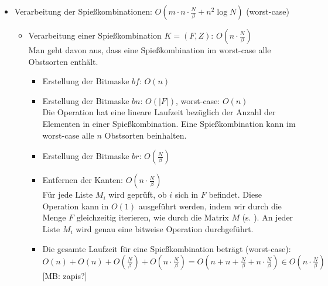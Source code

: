 \documentclass[a4paper,10pt,ngerman]{scrartcl}
\newcommand{\mb}[1]{{\color{red}[MB: #1]}}
\begin{document}
\begin{itemize}
\begin{itemize}
    \item Die gesamte Laufzeit für diesen Teil (worst-case): $O(n \cdot \frac{N}{\beta}) + O(n) + O(w \log w)
    + O(m \cdot n \log n) + O(w (\log n + \log w)) + O(m \cdot n \log n) = 
    O(n \cdot \frac{N}{\beta} + n + w \log w + m \cdot n \log n + w (\log n + \log w) + m \cdot n \log n) \in 
    O(n \cdot \frac{N}{\beta} + m \cdot n \log n + w (\log n + \log w)) \in 
    O(n (\frac{N}{\beta} + m \log n) + w (\log n + \log w))$ 
  \end{itemize}


  \item Verarbeitung der Spießkombinationen: $O(m \cdot n \cdot\frac{N}{\beta} + n^2 \log N)$ (worst-case)
  \begin{itemize}
    \item Verarbeitung einer Spießkombination $K = (F, Z)$: $O(n \cdot\frac{N}{\beta})$\\
    Man geht davon aus, dass eine Spießkombination im worst-case alle Obstsorten enthält.
    \begin{itemize}
      \item Erstellung der Bitmaske $bf$: $O(n)$

      \item Erstellung der Bitmaske $bn$: $O(|F|)$, worst-case: $O(n)$\\
      Die Operation hat eine lineare Laufzeit bezüglich der Anzahl der Elementen in 
      einer Spießkombination. Eine Spießkombination kann im worst-case alle $n$
      Obstsorten beinhalten.

      \item Erstellung der Bitmaske $br$: $O(\frac{N}{\beta})$

      \item Entfernen der Kanten: $O(n \cdot \frac{N}{\beta})$\\
      Für jede Liste $M_i$ wird geprüft, ob $i$ sich in $F$ befindet.
      Diese Operation kann in $O(1)$ ausgeführt werden, indem wir durch
      die Menge $F$ gleichzeitig iterieren, wie durch die Matrix $M$ (s. ).
      An jeder Liste $M_i$ wird genau eine bitweise Operation durchgeführt.

      \item Die gesamte Laufzeit für eine Spießkombination beträgt (worst-case):\\
      $O(n) + O(n) + O(\frac{N}{\beta}) + O(n \cdot\frac{N}{\beta}) 
      = O(n + n + \frac{N}{\beta} + n \cdot\frac{N}{\beta}) \in O(n \cdot\frac{N}{\beta})$ \mb{zapis?}
    \end{itemize}


\end{itemize}
\end{itemize}
\end{document}
